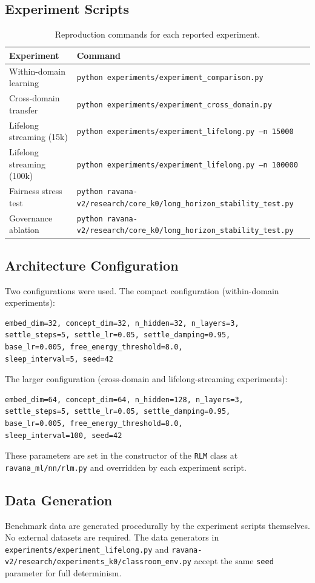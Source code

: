 \documentclass[11pt]{article}
\begin{document}
\subsection{Experiment Scripts}
\begin{table}[h]
\centering
\caption{Reproduction commands for each reported experiment.}
\label{tab:reproduction}
\begin{tabular}{ll}
\toprule
Experiment & Command \\
\midrule
Within-domain learning & \texttt{python experiments/experiment\_comparison.py} \\
Cross-domain transfer & \texttt{python experiments/experiment\_cross\_domain.py} \\
Lifelong streaming (15k) & \texttt{python experiments/experiment\_lifelong.py --n 15000} \\
Lifelong streaming (100k) & \texttt{python experiments/experiment\_lifelong.py --n 100000} \\
Fairness stress test & \texttt{python ravana-v2/research/core\_k0/long\_horizon\_stability\_test.py} \\
Governance ablation & \texttt{python ravana-v2/research/core\_k0/long\_horizon\_stability\_test.py} \\
\bottomrule
\end{tabular}
\end{table}

\subsection{Architecture Configuration}
Two configurations were used. The compact configuration (within-domain experiments):
\begin{verbatim}
embed_dim=32, concept_dim=32, n_hidden=32, n_layers=3,
settle_steps=5, settle_lr=0.05, settle_damping=0.95,
base_lr=0.005, free_energy_threshold=8.0,
sleep_interval=5, seed=42
\end{verbatim}
The larger configuration (cross-domain and lifelong-streaming experiments):
\begin{verbatim}
embed_dim=64, concept_dim=64, n_hidden=128, n_layers=3,
settle_steps=5, settle_lr=0.05, settle_damping=0.95,
base_lr=0.005, free_energy_threshold=8.0,
sleep_interval=100, seed=42
\end{verbatim}
These parameters are set in the constructor of the \texttt{RLM} class at \texttt{ravana\_ml/nn/rlm.py} and overridden by each experiment script.

\subsection{Data Generation}
Benchmark data are generated procedurally by the experiment scripts themselves. No external datasets are required. The data generators in \texttt{experiments/experiment\_lifelong.py} and \texttt{ravana-v2/research/experiments\_k0/classroom\_env.py} accept the same \texttt{seed} parameter for full determinism.
\end{document}
